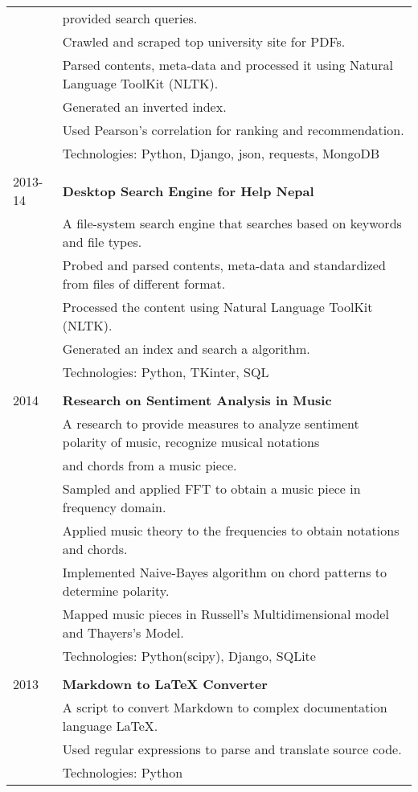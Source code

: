 \documentclass[letterpaper,10pt,oneside]{article}
\newcommand{\nextitem}{\par\hspace*{\labelsep}\textbullet\hspace*{\labelsep}}
\begin{document}
\begin{tabular}{l l}
         & provided search queries. \\
         & \footnotesize{\nextitem Crawled and scraped top university site for PDFs.} \\
         & \footnotesize{\nextitem Parsed contents, meta-data and processed it using Natural Language ToolKit (NLTK).} \\
         & \footnotesize{\nextitem Generated an inverted index.} \\
         & \footnotesize{\nextitem Used Pearson's correlation for ranking and recommendation.} \\
         & Technologies: Python, Django, json, requests, MongoDB \\
         \\
 2013-14 & \textbf{Desktop Search Engine for Help Nepal} \\
         & A file-system search engine that searches based on keywords and file types. \\
         & \footnotesize{\nextitem Probed and parsed contents, meta-data and standardized from files of different format.} \\
         & \footnotesize{\nextitem Processed the content using Natural Language ToolKit (NLTK).} \\
         & \footnotesize{\nextitem Generated an index and search a algorithm.} \\
         & Technologies: Python, TKinter, SQL \\
         \\
 2014    & \textbf{Research on Sentiment Analysis in Music} \\
         & A research to provide measures to analyze sentiment polarity of music, recognize musical notations \\
         & and chords from a music piece. \\
         & \footnotesize{\nextitem Sampled and applied FFT to obtain a music piece in frequency domain.} \\
         & \footnotesize{\nextitem Applied music theory to the frequencies to obtain notations and chords.} \\
         & \footnotesize{\nextitem Implemented Naive-Bayes algorithm on chord patterns to determine polarity.} \\
         & \footnotesize{\nextitem Mapped music pieces in Russell’s Multidimensional model and Thayers’s Model.} \\
         & Technologies: Python(scipy), Django, SQLite \\
         \\
 2013    & \textbf{Markdown to LaTeX Converter} \\
         & A script to convert Markdown to complex documentation language LaTeX. \\
         & \footnotesize{\nextitem Used regular expressions to parse and translate source code.} \\
         & Technologies: Python \\

\end{tabular}
\end{document}

